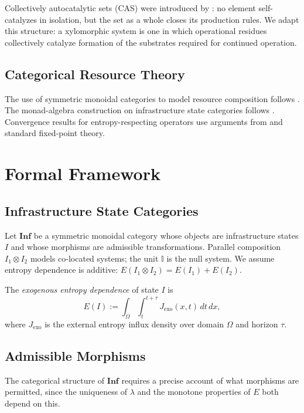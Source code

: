 \documentclass[10pt,twocolumn]{article}
\theoremstyle{plain}
\theoremstyle{definition}
\theoremstyle{remark}
\begin{document}
Collectively autocatalytic sets (CAS) were introduced by
\citet{kauffman1993}: no element self-catalyzes in isolation, but the
set as a whole closes its production rules. We adapt this structure:
a xylomorphic system is one in which operational residues collectively
catalyze formation of the substrates required for continued operation.

\subsection{Categorical Resource Theory}

The use of symmetric monoidal categories to model resource composition
follows \citet{baez2010}. The monad-algebra construction on infrastructure
state categories follows \citet{maclane1998}. Convergence results for
entropy-respecting operators use arguments from \citet{risken1989} and
standard fixed-point theory.

\section{Formal Framework}

\subsection{Infrastructure State Categories}

Let $\mathbf{Inf}$ be a symmetric monoidal category whose objects are
infrastructure states $I$ and whose morphisms are admissible
transformations. Parallel composition $I_1 \otimes I_2$ models
co-located systems; the unit $\mathbb{I}$ is the null system. We
assume entropy dependence is additive: $E(I_1 \otimes I_2) = E(I_1) +
E(I_2)$.

The \emph{exogenous entropy dependence} of state $I$ is
\[
  E(I) := \int_\Omega \int_t^{t+\tau}
  J_{\mathrm{exo}}(x,t)\,dt\,dx,
\]
where $J_{\mathrm{exo}}$ is the external entropy influx density over
domain $\Omega$ and horizon $\tau$.

\subsection{Admissible Morphisms}

The categorical structure of $\mathbf{Inf}$ requires a precise account
of what morphisms are permitted, since the uniqueness of $\lambda$ and
the monotone properties of $E$ both depend on this.
\end{document}
